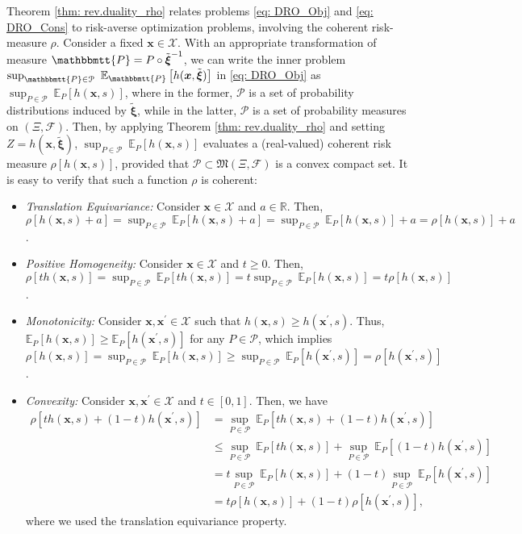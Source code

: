 \documentclass[final,onefignum,onetabnum]{class}
\newcommand{\ee}[2]{\mathbb{E}_{#1} \left[ #2 \right]}
\newcommand{\ro}[1]{\rho \left[ #1 \right]}
\newcommand{\bs}[1]{\boldsymbol{#1}} %
\newcommand{\Bs}[1]{\mathbb{#1}} %
\newcommand{\Ts}[1]{\mathbbmtt{#1}} %
\newcommand{\Cs}[1]{\mathcal{#1}} %
\newcommand{\Fs}[1]{\mathfrak{#1}} %
\newcommand{\txi}{\tilde{\bs{\xi}}}
\newcommand{\measurespace}{\left( \Xi, \Cs{F} \right)}
\begin{document}
Theorem \ref{thm: rev.duality_rho} relates problems \eqref{eq: DRO_Obj} and  \eqref{eq: DRO_Cons} to   risk-averse optimization problems, involving the coherent risk-measure $\rho$. 
Consider a fixed $\bs{x} \in \Cs{X}$. With an appropriate transformation of measure $\Ts{P}=P  \circ \txi^{-1}$, we can write  the inner problem $\sup_{\Ts{P} \in \Cs{P}} \ \ee{\Ts{P}}{h(\bs{x},\txi)}$ in \eqref{eq: DRO_Obj} as $\sup_{P \in \Cs{P}} \ \ee{P}{h(\bs{x},s)}$, where in the former, $\Cs{P}$ is a set of probability distributions induced by $\txi$, while in the latter, $\Cs{P}$ is a set of probability measures on $\measurespace$. Then, by applying Theorem \ref{thm: rev.duality_rho} and setting $Z=h(\bs{x},\txi)$, $\sup_{P \in \Cs{P}} \ \ee{P}{h(\bs{x},s)}$ evaluates a (real-valued) coherent risk measure $\ro{h(\bs{x},s)}$, provided that 
$\Cs{P} \subset \Fs{M}\measurespace$ is a convex compact  set. %
It is easy to verify that  such a  function $\rho$ is coherent: 
\begin{itemize}
	\item {\it Translation Equivariance:}  Consider $\bs{x} \in \Cs{X}$ and $a \in \Bs{R}$. 
	Then, $ \ro{h(\bs{x},s)+ a}= \sup_{P \in \Cs{P}} \ \ee{P}{h(\bs{x},s)+a}= \sup_{P \in \Cs{P}} \ \ee{P}{h(\bs{x},s)} +a = \ro{h(\bs{x},s)} + a$. 
	
	\item {\it Positive Homogeneity:} Consider $\bs{x} \in \Cs{X}$ and $t \ge 0$. Then, $\ro{t  h(\bs{x},s)}= \sup_{P \in \Cs{P}} \ \ee{P}{t  h(\bs{x},s)}= t \sup_{P \in \Cs{P}} \ \ee{P}{h(\bs{x},s)}= t \ro{h(\bs{x},s)}$. 
	
	
	\item {\it Monotonicity:} Consider $\bs{x}, \bs{x}^{\prime} \in \Cs{X}$ such that $h(\bs{x},s) \ge h(\bs{x}^{\prime},s)$. Thus, $\ee{P}{h(\bs{x},s)} \ge \ee{P}{h(\bs{x}^{\prime},s)}$ for any $P \in \Cs{P}$, which implies  \linebreak $\ro{h(\bs{x},s)}=\sup_{P \in \Cs{P}} \ \ee{P}{h(\bs{x},s)} \ge \sup_{P \in \Cs{P}} \ \ee{P}{h(\bs{x}^{\prime},s)}=\ro{h(\bs{x}^{\prime},s)}$.
	
	\item {\it Convexity:} Consider $\bs{x}, \bs{x}^{\prime} \in \Cs{X}$ and $t \in [0,1]$.
	Then, we have 
	\begin{align*}
	    \ro{t  h(\bs{x},s)+ (1-t)   h(\bs{x}^{\prime},s)} & = \sup_{P \in \Cs{P}} \ \ee{P}{t  h(\bs{x},s) + (1-t)  h(\bs{x}^{\prime},s)}\\
	    & \le \sup_{P \in \Cs{P}} \ \ee{P}{t   h(\bs{x},s)} +  \sup_{P \in \Cs{P}} \ \ee{P}{ (1-t)  h(\bs{x}^{\prime},s)} \\
	    & = t \sup_{P \in \Cs{P}} \ \ee{P}{ h(\bs{x},s)} +  (1-t) \sup_{P \in \Cs{P}} \ \ee{P}{h(\bs{x}^{\prime},s)}\\
	    & = t \ro{h(\bs{x},s)} + (1-t) \ro{h(\bs{x}^{\prime},s)},
	\end{align*}
	where we used the translation equivariance property. 
	
\end{itemize}
\end{document}
